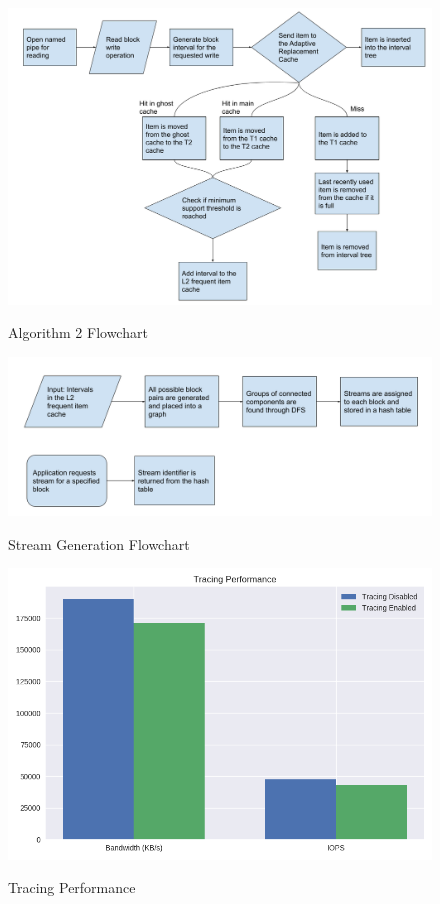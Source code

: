 \documentclass[MEng]{uofl}
\begin{document}
\begin{figure}
    \caption{Algorithm 2 Flowchart}
    \includegraphics[width=\columnwidth]{d3.png}
    \label{a2}
\end{figure}

\begin{figure}
    \caption{Stream Generation Flowchart}
    \includegraphics[width=\columnwidth]{d4.png}
    \label{sg}
\end{figure}

\begin{figure}
    \caption{Tracing Performance}
    \includegraphics[width=\columnwidth]{bandwidth1.png}
    \label{tracing}
\end{figure}
\end{document}
